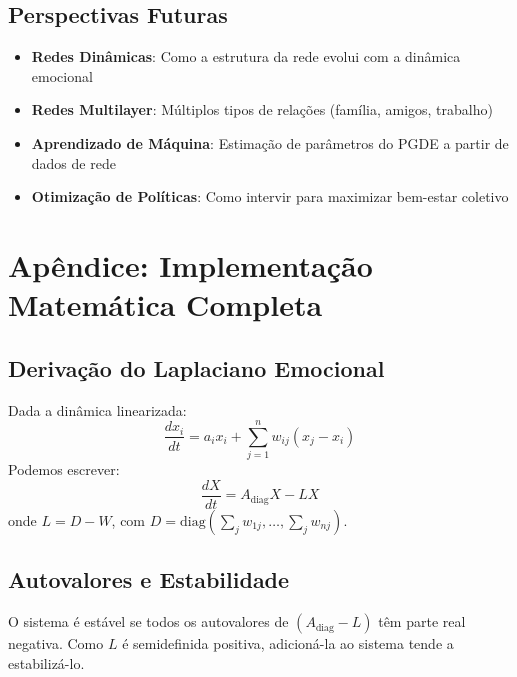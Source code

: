 \documentclass[12pt, a4paper]{article}
\begin{document}
\subsection{Perspectivas Futuras}

\begin{itemize}
\item \textbf{Redes Dinâmicas}: Como a estrutura da rede evolui com a dinâmica emocional
\item \textbf{Redes Multilayer}: Múltiplos tipos de relações (família, amigos, trabalho)
\item \textbf{Aprendizado de Máquina}: Estimação de parâmetros do PGDE a partir de dados de rede
\item \textbf{Otimização de Políticas}: Como intervir para maximizar bem-estar coletivo
\end{itemize}

\section*{Apêndice: Implementação Matemática Completa}

\subsection*{Derivação do Laplaciano Emocional}

Dada a dinâmica linearizada:
\[
\frac{dx_i}{dt} = a_i x_i + \sum_{j=1}^n w_{ij}(x_j - x_i)
\]
Podemos escrever:
\[
\frac{dX}{dt} = A_{\text{diag}} X - L X
\]
onde $L = D - W$, com $D = \text{diag}(\sum_j w_{1j}, \dots, \sum_j w_{nj})$.

\subsection*{Autovalores e Estabilidade}

O sistema é estável se todos os autovalores de $(A_{\text{diag}} - L)$ têm parte real negativa. Como $L$ é semidefinida positiva, adicioná-la ao sistema tende a estabilizá-lo.
\end{document}
